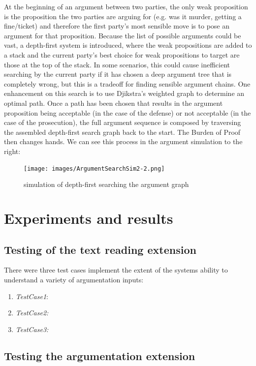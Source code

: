 \documentclass[10pt,a4paper,twocolumn]{article}
\begin{document}
At the beginning of an argument between two parties, the only weak
proposition is the proposition the two parties are arguing for (e.g. was it murder,
getting a fine/ticket) and therefore the first party's most sensible move is to
pose an argument for that proposition. Because the list of possible arguments
could be vast, a depth-first system is introduced, where the weak propositions
are added to a stack and the current party's best choice for weak propositions
to target are those at the top of the stack. In some scenarios, this could cause
inefficient searching by the current party if it has chosen a deep argument tree
that is completely wrong, but this is a tradeoff for finding sensible argument
chains. One enhancement on this search is to use Djikstra's weighted graph to
determine an optimal path. Once a path has been chosen that results in the
argument proposition being acceptable (in the case of the defense) or not
acceptable (in the case of the prosecution), the full argument sequence is
composed by traversing the assembled depth-first search graph back to the start.
The Burden of Proof then changes hands. We can see this process in the argument
simulation to the right:

\begin{figure}[h!]
	\texttt{[image: images/ArgumentSearchSim2-2.png]}
	\centering
	\caption{simulation of depth-first searching the argument graph}
\end{figure}

\section{Experiments and results}

\subsection{Testing of the text reading extension}

There were three test cases implement the extent of the systems ability to
understand a variety of argumentation inputs: 

\begin{enumerate}
	\item \textit{TestCase1}:
	\item \textit{TestCase2:}
	\item \textit{TestCase3:}
\end{enumerate}


\subsection{Testing the argumentation extension}
\end{document}
